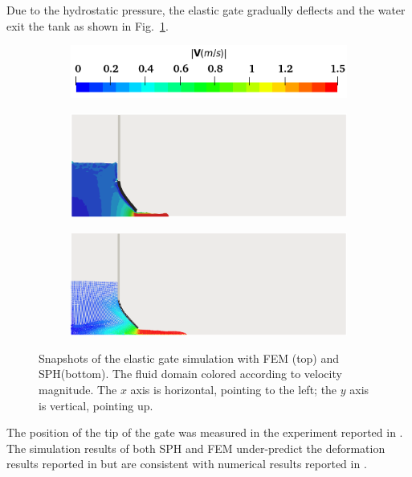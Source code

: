 \documentclass[final,3p,times]{elsarticle}
\begin{document}
Due to the hydrostatic pressure, the elastic gate gradually deflects and the water exit the tank as shown in Fig.~\ref{fig:EG}.
\begin{figure}[H]
	\centering	
	\begin{subfigure}{0.4\columnwidth}	
		\centering
		\includegraphics[width=1.0\textwidth]{Images/FSI_colorbar.png}
	\end{subfigure}
	\begin{subfigure}{0.8\columnwidth}	
		\centering
		\includegraphics[width=1.0\textwidth]{Images/FSI_FEM.png}
	\end{subfigure}
	\begin{subfigure}{0.8\columnwidth}
		\centering
		\includegraphics[width=1.0\textwidth]{Images/FSI_SPH.png}
	\end{subfigure}
		\caption{Snapshots of the elastic gate simulation with FEM (top) and SPH(bottom). The fluid domain colored according to velocity magnitude. The $x$ axis is horizontal, pointing to the left; the $y$ axis is vertical, pointing up.}
		\label{fig:EG}
\end{figure} 
The position of the tip of the gate was measured in the experiment reported in \cite{Antoci2007}. The simulation results of both SPH and FEM under-predict the deformation results reported in \cite{Antoci2007} but are consistent with numerical results reported in \cite{yang2012}.
\end{document}

